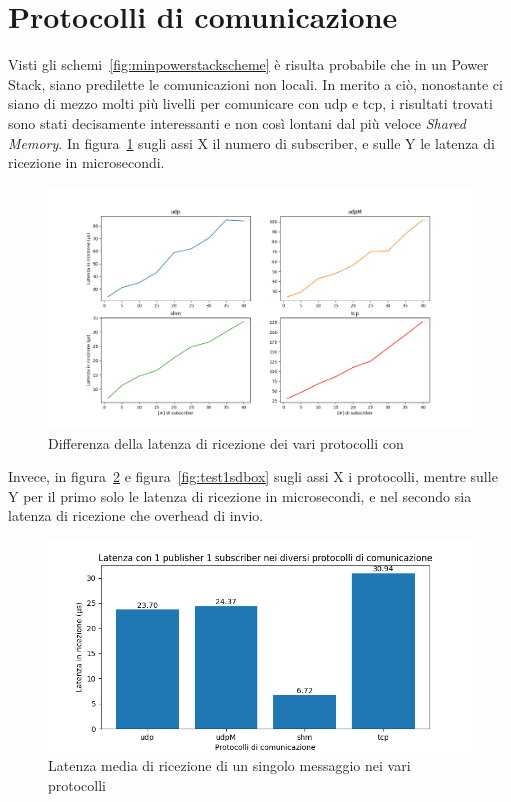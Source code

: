 \section{Protocolli di comunicazione}
Visti gli schemi~\ref{fig:minpowerstackscheme} è risulta probabile che in un Power Stack, siano predilette le comunicazioni non locali. In merito a ciò, nonostante ci siano di mezzo molti più livelli per comunicare con udp e tcp, i risultati trovati sono stati decisamente interessanti e non così lontani dal più veloce \emph{Shared Memory}. 
In figura~\ref{fig:test3_different_protocols} sugli assi X il numero di subscriber, e sulle Y le latenza di ricezione in microsecondi.
\begin{figure}[H]
    \includegraphics[width=\textwidth]{./results/test3_different_protocol_send_receive.png} 
        \caption{Differenza della latenza di ricezione dei vari protocolli con }\label{fig:test3_different_protocols}
\end{figure}
Invece, in figura~\ref{fig:test3_different_protocols2} e figura~\ref{fig:test1sdbox} sugli assi X i protocolli, mentre sulle Y per il primo solo le latenza di ricezione in microsecondi, e nel secondo sia latenza di ricezione che overhead di invio.
\begin{figure}[H]
    \includegraphics[width=\textwidth]{./results/test1_bar_sr_1p1s.png} 
        \caption{Latenza media di ricezione di un singolo messaggio nei vari protocolli}\label{fig:test3_different_protocols2}
\end{figure}

